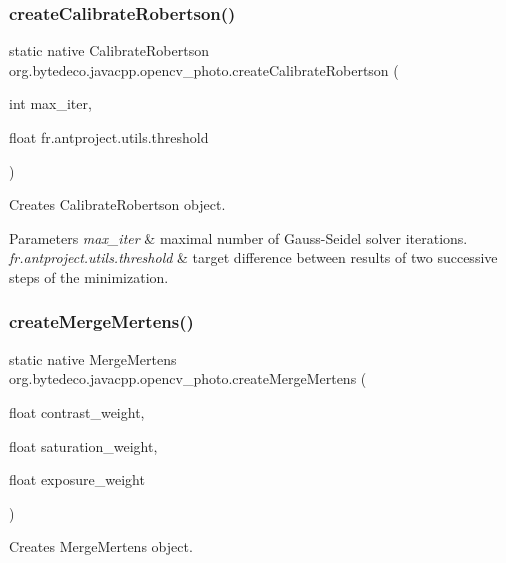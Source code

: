 \subsubsection{\texorpdfstring{create\+Calibrate\+Robertson()}{createCalibrateRobertson()}}
{\footnotesize\ttfamily static native Calibrate\+Robertson org.\+bytedeco.\+javacpp.\+opencv\+\_\+photo.\+create\+Calibrate\+Robertson (\begin{DoxyParamCaption}\item[{int}]{max\+\_\+iter,  }\item[{float}]{fr.antproject.utils.threshold }\end{DoxyParamCaption})\hspace{0.3cm}{\ttfamily [static]}}



Creates Calibrate\+Robertson object. 


\begin{DoxyParams}{Parameters}
{\em max\+\_\+iter} & maximal number of Gauss-\/\+Seidel solver iterations. \\
\hline
{\em fr.antproject.utils.threshold} & target difference between results of two successive steps of the minimization. \\
\hline
\end{DoxyParams}
\mbox{\label{group__photo__hdr_ga7f47cc9c6b5e72f9fbf7281271dfc426}} 
\subsubsection{\texorpdfstring{create\+Merge\+Mertens()}{createMergeMertens()}}
{\footnotesize\ttfamily static native Merge\+Mertens org.\+bytedeco.\+javacpp.\+opencv\+\_\+photo.\+create\+Merge\+Mertens (\begin{DoxyParamCaption}\item[{float}]{contrast\+\_\+weight,  }\item[{float}]{saturation\+\_\+weight,  }\item[{float}]{exposure\+\_\+weight }\end{DoxyParamCaption})\hspace{0.3cm}{\ttfamily [static]}}



Creates Merge\+Mertens object. 


